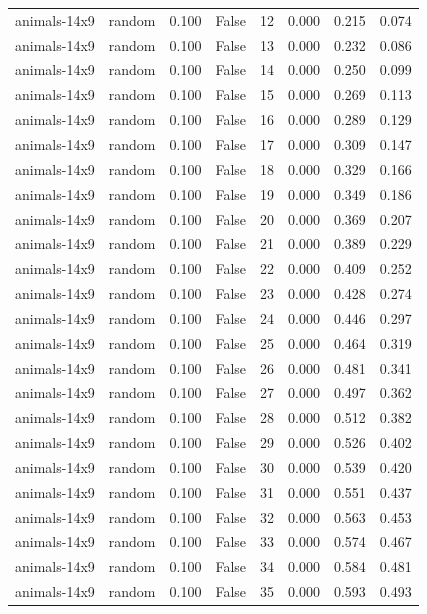 \begin{tabular}{llrrrrrr}
animals-14x9 & random & 0.100 & False & 12 & 0.000 & 0.215 & 0.074 \\
animals-14x9 & random & 0.100 & False & 13 & 0.000 & 0.232 & 0.086 \\
animals-14x9 & random & 0.100 & False & 14 & 0.000 & 0.250 & 0.099 \\
animals-14x9 & random & 0.100 & False & 15 & 0.000 & 0.269 & 0.113 \\
animals-14x9 & random & 0.100 & False & 16 & 0.000 & 0.289 & 0.129 \\
animals-14x9 & random & 0.100 & False & 17 & 0.000 & 0.309 & 0.147 \\
animals-14x9 & random & 0.100 & False & 18 & 0.000 & 0.329 & 0.166 \\
animals-14x9 & random & 0.100 & False & 19 & 0.000 & 0.349 & 0.186 \\
animals-14x9 & random & 0.100 & False & 20 & 0.000 & 0.369 & 0.207 \\
animals-14x9 & random & 0.100 & False & 21 & 0.000 & 0.389 & 0.229 \\
animals-14x9 & random & 0.100 & False & 22 & 0.000 & 0.409 & 0.252 \\
animals-14x9 & random & 0.100 & False & 23 & 0.000 & 0.428 & 0.274 \\
animals-14x9 & random & 0.100 & False & 24 & 0.000 & 0.446 & 0.297 \\
animals-14x9 & random & 0.100 & False & 25 & 0.000 & 0.464 & 0.319 \\
animals-14x9 & random & 0.100 & False & 26 & 0.000 & 0.481 & 0.341 \\
animals-14x9 & random & 0.100 & False & 27 & 0.000 & 0.497 & 0.362 \\
animals-14x9 & random & 0.100 & False & 28 & 0.000 & 0.512 & 0.382 \\
animals-14x9 & random & 0.100 & False & 29 & 0.000 & 0.526 & 0.402 \\
animals-14x9 & random & 0.100 & False & 30 & 0.000 & 0.539 & 0.420 \\
animals-14x9 & random & 0.100 & False & 31 & 0.000 & 0.551 & 0.437 \\
animals-14x9 & random & 0.100 & False & 32 & 0.000 & 0.563 & 0.453 \\
animals-14x9 & random & 0.100 & False & 33 & 0.000 & 0.574 & 0.467 \\
animals-14x9 & random & 0.100 & False & 34 & 0.000 & 0.584 & 0.481 \\
animals-14x9 & random & 0.100 & False & 35 & 0.000 & 0.593 & 0.493 \\

\end{tabular}
